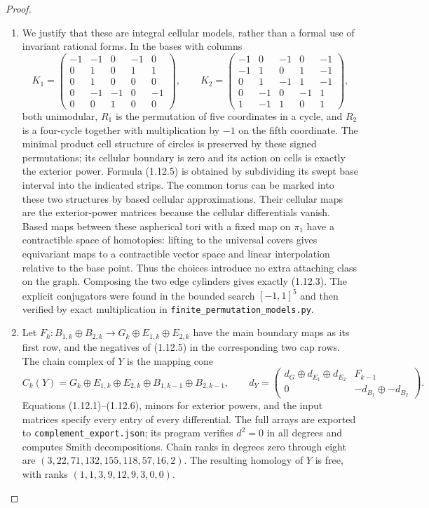 \documentclass[11pt,a4paper]{article}
\theoremstyle{definition}
\begin{document}
\begin{proof}
\begin{enumerate}[label=\arabic*.]
\item We justify that these are integral cellular models, rather than a
formal use of invariant rational forms.  In the bases with columns
\[
K_1=\begin{pmatrix}
-1&-1&0&-1&0\\0&1&0&1&1\\0&1&0&0&0\\
0&-1&-1&0&-1\\0&0&1&0&0
\end{pmatrix},\qquad
K_2=\begin{pmatrix}
-1&0&-1&0&-1\\-1&1&0&1&-1\\0&1&-1&1&-1\\
0&-1&0&-1&1\\1&-1&1&0&1
\end{pmatrix},
\]
both unimodular, $R_1$ is the permutation of five coordinates in a
cycle, and $R_2$ is a four-cycle together with multiplication by $-1$
on the fifth coordinate.  The minimal product cell structure of
circles is preserved by these signed permutations; its cellular
boundary is zero and its action on cells is exactly the exterior
power.  Formula (1.12.5) is obtained by subdividing its swept
base interval into the indicated strips.  The common torus can be
marked into these two structures by based cellular approximations.
Their cellular maps are the exterior-power matrices because the
cellular differentials vanish.  Based maps between these aspherical
tori with a fixed map on $\pi_1$ have a contractible space of
homotopies: lifting to the universal covers gives equivariant maps
to a contractible vector space and linear interpolation relative to
the base point.  Thus the choices introduce no extra attaching class
on the graph.  Composing the two edge cylinders gives exactly
(1.12.3).  The explicit conjugators were found in the bounded search
$[-1,1]^5$ and then verified by exact multiplication in
\texttt{finite\_permutation\_models.py}.

\item Let $F_k:B_{1,k}\oplus B_{2,k}\to G_k\oplus E_{1,k}\oplus E_{2,k}$
have the main boundary maps as its first row, and the negatives of
(1.12.5) in the corresponding two cap rows.  The chain complex of
$Y$ is the mapping cone
\[
C_k(Y)=G_k\oplus E_{1,k}\oplus E_{2,k}
       \oplus B_{1,k-1}\oplus B_{2,k-1},\qquad
d_Y=\begin{pmatrix}d_G\oplus d_{E_1}\oplus d_{E_2}&F_{k-1}\\
0&-d_{B_1}\oplus-d_{B_2}\end{pmatrix}.
\tag{1.12.6}
\]
Equations (1.12.1)--(1.12.6), minors for exterior powers, and the input
matrices specify every entry of every differential.
The full arrays are exported to \texttt{complement\_export.json}; its
program verifies $d^2=0$ in all degrees and computes Smith
decompositions.  Chain ranks in degrees zero through eight are
$(3,22,71,132,155,118,57,16,2)$.
The resulting homology of $Y$ is free, with ranks
$(1,1,3,9,12,9,3,0,0)$.


\end{enumerate}
\end{proof}
\end{document}
